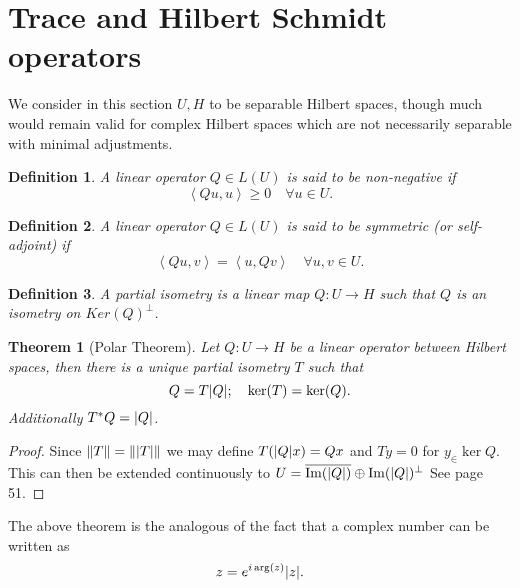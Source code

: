 \documentclass[12pt]{article}
\newcommand{\br}[1]{\left\langle#1\right\rangle}
\newtheorem{theorem}{Theorem}
\newtheorem{definition}{Definition}
\begin{document}
\section{Trace and Hilbert Schmidt operators}
We consider in this section $U,H$ to be separable Hilbert spaces, though much would remain valid for complex Hilbert spaces which are not necessarily separable with minimal adjustments.
\begin{definition}
	A linear operator $Q\in L(U)$ is said to be non-negative if
	\begin{equation*}
		\br{Qu,u}\geq 0\quad\forall u\in U.
	\end{equation*}
\end{definition}
\begin{definition}
	A linear operator $Q\in L(U)$ is said to be symmetric (or self-adjoint) if
	\begin{equation*}
		\br{Qu,v}=\br{u,Qv}\quad\forall u,v\in U.
	\end{equation*}
\end{definition}
\begin{definition}
	A partial isometry is a linear map $Q:U\to H$ such that $Q$ is an isometry on $Ker(Q)^\perp$.
\end{definition}
\begin{theorem}[Polar Theorem]
	Let $Q:U\to H$ be a linear operator between Hilbert spaces, then there is a unique partial isometry $T$ such that
	\begin{equation*}
		Q=T\abs{Q};\quad \ker(T)=\ker(Q).
	\end{equation*}
	Additionally $T^*Q=\abs{Q}$.
\end{theorem}
\begin{proof}
	Since $\norm{T}=\norm{\abs{T}}$ we may define $T(\abs{Q}x)=Qx$ and  $Ty=0$ for  $y_\in \ker{Q}$. This can then be extended continuously to $U=\overline{\Im(\abs{Q})}\oplus \Im(\abs{Q})^\perp$   See \cite{murphy2014c} page 51.
\end{proof}

The above theorem is the analogous of the fact that a complex number can be written as
\begin{equation*}
	z=e^{i\arg(z)}\abs{z}.
\end{equation*}
\end{document}
